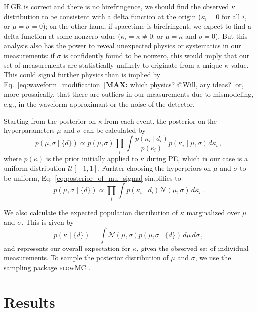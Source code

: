 \documentclass[aps,prd,twocolumn,superscriptaddress,preprintnumbers,floatfix,nofootinbib]{revtex4-2}
\newcommand*{\mi}[1]{\textsf{\color{magenta} [\textbf{MAX:} #1]}}
\begin{document}
If \ac{GR} is correct and there is no birefringence, we should find the observed $\kappa$ distribution to be consistent with a delta function at the origin ($\kappa_i = 0$ for all $i$, or $\mu=\sigma=0$); on the other hand, if spacetime is birefringent, we expect to find a delta function at some nonzero value ($\kappa_i = \kappa \neq 0$, or $\mu = \kappa$ and $\sigma=0$).
But this analysis also has the power to reveal unexpected physics or systematics in our measurements: if $\sigma$ is confidently found to be nonzero, this would imply that our set of measurements are statistically unlikely to originate from a unique $\kappa$ value.
This could signal further physics than is implied by Eq.~\eqref{eq:waveform_modification} \mi{which physics? @Will, any ideas?} or, more prosaically, that there are outliers in our measurements due to mismodeling, e.g., in the waveform approximant or the noise of the detector.

Starting from the posterior on $\kappa$ from each event, the posterior on the hyperparameters $\mu$ and $\sigma$ can be calculated by
\begin{equation}
    p(\mu,\sigma \mid \{d\})\propto p(\mu,\sigma)\prod_{i}\int\frac{p(\kappa_i\mid d_i)}{p(\kappa_i)}p(\kappa_i\mid\mu,\sigma)\,d\kappa_i\,,
    \label{eq:posterior_of_mu_sigma}
\end{equation}
where $p(\kappa)$ is the prior initially applied to $\kappa$ during \ac{PE}, which in our case is a uniform distribution $\mathcal{U}[-1,1]$.
Furhter choosing the hyperpriors on $\mu$ and $\sigma$ to be uniform, Eq.~\eqref{eq:posterior_of_mu_sigma} simplifies to
\begin{equation}
    p(\mu,\sigma\mid\{d\})\propto\prod_{i}\int p(\kappa_i\mid d_i)\mathcal{N}(\mu,\sigma)\,d\kappa_i\,.
\end{equation}

We also calculate the expected population distribution of $\kappa$ marginalized over $\mu$ and $\sigma$.
This is given by
\begin{equation}
            p(\kappa\mid \{d\})=\int \mathcal{N}(\mu,\sigma)p(\mu,\sigma\mid \{d\})\,d\mu\,d\sigma\, , 
    \label{eq:generic_posterior}
\end{equation}
and represents our overall expectation for $\kappa$, given the observed set of individual measurements.
To sample the posterior distribution of $\mu$ and $\sigma$, we use the sampling package \textsc{flowMC} \citep{flowMC}.

\section{Results}
\label{sec:Results}
\end{document}
